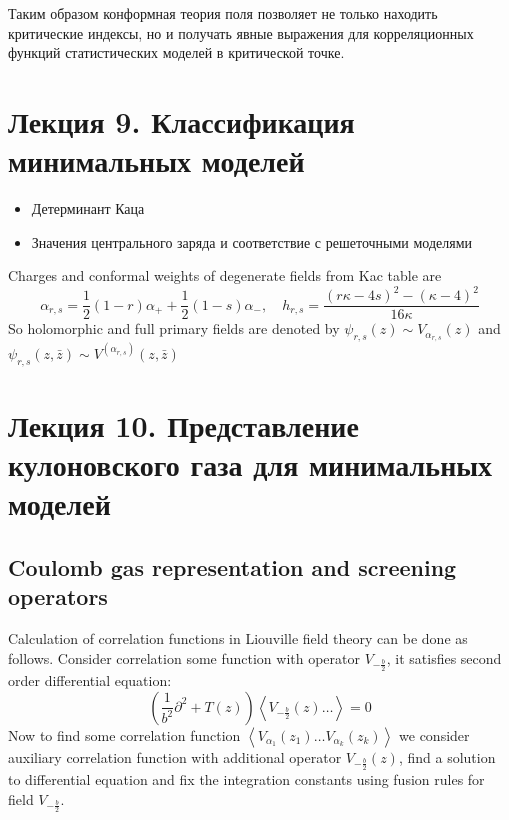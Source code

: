 \documentclass[a4paper,12pt]{article}
\theoremstyle{definition}
\theoremstyle{definition}
\theoremstyle{definition}
\begin{document}
Таким образом конформная теория поля позволяет не только находить критические индексы, но и получать явные выражения для корреляционных функций статистических моделей в критической точке. 

\section{Лекция 9. Классификация минимальных моделей}
\label{sec:lecture-7}


  \begin{itemize}
  \item Детерминант Каца
  \item Значения центрального заряда и соответствие с решеточными моделями
  \end{itemize}

Charges and conformal weights of degenerate fields from Kac table are
\begin{equation}
  \label{eq:139}
  \alpha_{r,s}=\frac{1}{2}(1-r)\alpha_{+}+\frac{1}{2}(1-s)\alpha_{-},\quad h_{r,s}=\frac{(r\kappa-4s)^{2}-(\kappa-4)^{2}}{16\kappa}
\end{equation}
So holomorphic and full primary fields are denoted by $\psi_{r,s}(z)\sim V_{\alpha_{r,s}}(z)$ and
$\psi_{r,s}(z,\bar z)\sim V^{(\alpha_{r,s})}(z,\bar z)$

\section{Лекция 10. Представление кулоновского газа для минимальных моделей}
\label{sec:lecture-8}

\subsection{Coulomb gas representation and screening operators}
\label{sec:coul-gas-repr}

Calculation of correlation functions in Liouville field theory can be done as follows. 
Consider correlation some function with operator $V_{-\frac{b}{2}}$, it satisfies second order
differential equation:
\begin{equation}
  \label{eq:33}
  \left(\frac{1}{b^{2}}\partial^{2}+T(z)\right)\left<V_{-\frac{b}{2}}(z) \dots \right>=0
\end{equation}
Now to find some correlation function $\left<V_{\alpha_{1}}(z_{1})\dots
  V_{\alpha_{k}}(z_{k})\right>$ we consider auxiliary correlation function with additional
operator $V_{-\frac{b}{2}}(z)$, find a solution to differential equation and fix the integration
constants using fusion rules for field $V_{-\frac{b}{2}}$.
\end{document}
